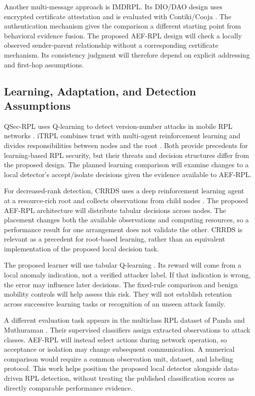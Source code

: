 \documentclass[journal]{IEEEtran}
\begin{document}
Another multi-message approach is IMDRPL. Its DIO/DAO design uses encrypted certificate attestation and is evaluated with Contiki/Cooja \cite{imdrpl2023}. The authentication mechanism gives the comparison a different starting point from behavioral evidence fusion. The proposed AEF-RPL design will check a locally observed sender-parent relationship without a corresponding certificate mechanism. Its consistency judgment will therefore depend on explicit addressing and first-hop assumptions.

\subsection{Learning, Adaptation, and Detection Assumptions}
QSec-RPL uses Q-learning to detect version-number attacks in mobile RPL networks \cite{qsecrpl2023}. iTRPL combines trust with multi-agent reinforcement learning and divides responsibilities between nodes and the root \cite{itrpl2024}. Both provide precedents for learning-based RPL security, but their threats and decision structures differ from the proposed design. The planned learning comparison will examine changes to a local detector's accept/isolate decisions given the evidence available to AEF-RPL.

For decreased-rank detection, CRRDS uses a deep reinforcement learning agent at a resource-rich root and collects observations from child nodes \cite{haqdad2026}. The proposed AEF-RPL architecture will distribute tabular decisions across nodes. The placement changes both the available observations and computing resources, so a performance result for one arrangement does not validate the other. CRRDS is relevant as a precedent for root-based learning, rather than an equivalent implementation of the proposed local decision task.

The proposed learner will use tabular Q-learning \cite{watkins1992}. Its reward will come from a local anomaly indication, not a verified attacker label. If that indication is wrong, the error may influence later decisions. The fixed-rule comparison and benign mobility controls will help assess this risk. They will not establish retention across successive learning tasks or recognition of an unseen attack family.

A different evaluation task appears in the multiclass RPL dataset of Panda and Muthuraman \cite{panda2026}. Their supervised classifiers assign extracted observations to attack classes. AEF-RPL will instead select actions during network operation, so acceptance or isolation may change subsequent communication. A numerical comparison would require a common observation unit, dataset, and labeling protocol. This work helps position the proposed local detector alongside data-driven RPL detection, without treating the published classification scores as directly comparable performance evidence.
\end{document}

